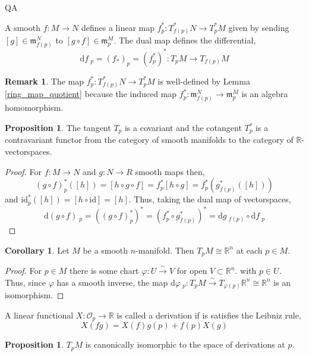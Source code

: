 QA	 \documentclass[12pt]{extarticle}
\newcommand{\R}{\mathbb{R}}
\newcommand{\id}{\mathrm{id}}
\renewcommand{\d}[1]{ \mathrm{d}#1 \:}
\theoremstyle{definition}
\newtheorem{proposition}[theorem]{Proposition}
\newtheorem{corollary}[theorem]{Corollary}
\newtheorem{remark}{Remark}
\newenvironment{definition}[1][Definition:]{\begin{trivlist}
\item[\hskip \labelsep {\bfseries #1}]}{\end{trivlist}}
\renewcommand{\O}{\mathcal{O}}
\newcommand{\m}{\mathfrak{m}}
\begin{document}
\begin{definition}
A smooth $f : M \to N$ defines a linear map $f^*_p : T_{f(p)}^* N \to T_{p}^* M$ given by sending $[g] \in \m^N_{f(p)}$ to $[g \circ f] \in \m^M_p$. The dual map defines the differential, 
\[ \d{f}_p = (f_*)_p = (f^*_p)^* : T_p M \to T_{f(p)} M \]  
\end{definition}

\begin{remark}
The map $f^*_p : T_{f(p)}^* N \to T_{p}^* M$ is well-defined by Lemma \ref{ring_map_quotient} because the induced map $f^*_p : \m_{f(p)}^N \to \m_p^M$ is an algebra homomorphism. 
\end{remark}

\begin{proposition}
The tangent $T_p$ is a covariant and the cotangent $T_p^*$ is a contravariant functor from the category of smooth manifolds to the category of $\R$-vectorspaces.  
\end{proposition}

\begin{proof}
For $f : M \to N$ and $g : N \to R$ smooth maps then, 
\[ (g \circ f)^*_p([h]) = [h \circ g \circ f] = f_p^* [h \circ g] = f_p^* (g_{f(p)}^*([h])) \]
and $\id_p^*([h]) = [h \circ \id] = [h]$. Thus, taking the dual map of vectorspaces,
\[ \d{(g \circ f)}_p = ((g \circ f)^*_p)^* = (f^*_p \circ g^*_{f(p)})^* = \d{g}_{f(p)} \circ \d{f}_p \] 
\end{proof}

\begin{corollary}
Let $M$ be a smooth $n$-manifold. Then $T_p M \cong \R^n$ at each $p \in M$.
\end{corollary}

\begin{proof}
For $p \in M$ there is some chart $\varphi : U \xrightarrow{\sim} V$ for open $V \subset \R^n$. with $p \in U$. Thus, since $\varphi$ has a smooth inverse, the map $\d{\varphi}_p : T_p M \xrightarrow{\sim} T_{\varphi(p)} \R^n \cong \R^n$ is an isomorphism.    
\end{proof}

\begin{definition}
A linear functional $X : \O_p \to \R$ is called a derivation if is satisfies the Leibniz rule, \[ X(fg) = X(f) g(p) + f(p) X(g) \] 
\end{definition}

\begin{proposition}
$T_p M$ is canonically isomorphic to the space of derivations at $p$. 
\end{proposition}
\end{document}
